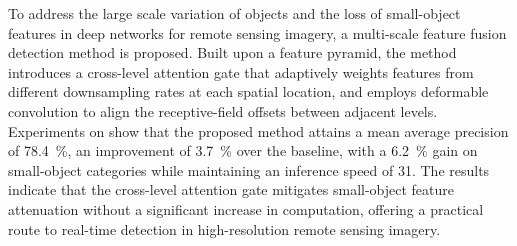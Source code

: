 
\begin{abstract}
针对遥感图像中目标尺度跨度大、小目标特征在深层网络中易丢失的问题，提出一种
多尺度特征融合的目标检测方法。该方法在特征金字塔的基础上引入跨层注意力
门控，按空间位置自适应地加权来自不同下采样倍率的特征，并以可变形卷积
对齐相邻层级的感受野偏移。在 \dataset{} 数据集上的实验表明，所提方法的
平均精度均值达到 \qty{78.4}{\percent}，较基线方法提升 \qty{3.7}{\percent}，
其中小目标类别的平均精度提升 \qty{6.2}{\percent}，推理速度保持在
\qty{31}{\fps}。结果说明跨层注意力门控能够在不显著增加计算量的
前提下缓解小目标特征衰减，为高分辨率遥感图像的实时检测提供了可行方案。
\end{abstract}

\begin{enabstract}
To address the large scale variation of objects and the loss of small-object
features in deep networks for remote sensing imagery, a multi-scale feature
fusion detection method is proposed. Built upon a feature pyramid, the method
introduces a cross-level attention gate that adaptively weights features from
different downsampling rates at each spatial location, and employs deformable
convolution to align the receptive-field offsets between adjacent levels.
Experiments on \dataset{} show that the proposed method attains a mean average
precision of \qty{78.4}{\percent}, an improvement of \qty{3.7}{\percent} over
the baseline, with a \qty{6.2}{\percent} gain on small-object categories while
maintaining an inference speed of \qty{31}{\fps}. The results
indicate that the cross-level attention gate mitigates small-object feature
attenuation without a significant increase in computation, offering a practical
route to real-time detection in high-resolution remote sensing imagery.
\end{enabstract}
